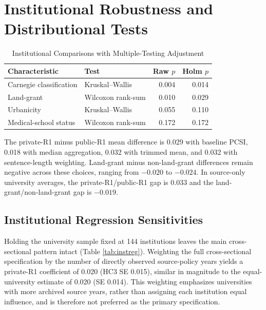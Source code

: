 \documentclass[11pt]{article}
\begin{document}
\section{Institutional Robustness and Distributional Tests}
\begin{table}[htbp]\centering\caption{Institutional Comparisons with Multiple-Testing Adjustment}\small\begin{tabular}{llrr}\toprule Characteristic&Test&Raw $p$&Holm $p$\\\midrule Carnegie classification&Kruskal--Wallis&0.004&0.014\\Land-grant&Wilcoxon rank-sum&0.010&0.029\\Urbanicity&Kruskal--Wallis&0.055&0.110\\Medical-school status&Wilcoxon rank-sum&0.172&0.172\\\bottomrule\end{tabular}\end{table}
The private-R1 minus public-R1 mean difference is 0.029 with baseline PCSI, 0.018 with median aggregation, 0.032 with trimmed mean, and 0.032 with sentence-length weighting. Land-grant minus non-land-grant differences remain negative across these choices, ranging from $-0.020$ to $-0.024$. In source-only university averages, the private-R1/public-R1 gap is 0.033 and the land-grant/non-land-grant gap is $-0.019$.


\subsection{Institutional Regression Sensitivities}
Holding the university sample fixed at 144 institutions leaves the main cross-sectional pattern intact (Table \ref{tab:instreg}). Weighting the full cross-sectional specification by the number of directly observed source-policy years yields a private-R1 coefficient of 0.020 (HC3 SE 0.015), similar in magnitude to the equal-university estimate of 0.020 (SE 0.014). This weighting emphasizes universities with more archived source years, rather than assigning each institution equal influence, and is therefore not preferred as the primary specification.
\end{document}
